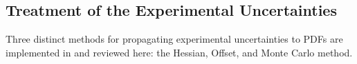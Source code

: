 \subsection{Treatment of the Experimental Uncertainties}
\label{sec:experimentalerrors}


Three distinct methods for propagating experimental uncertainties to PDFs are implemented in \fitter and reviewed here:
the Hessian, Offset, and Monte Carlo method.
